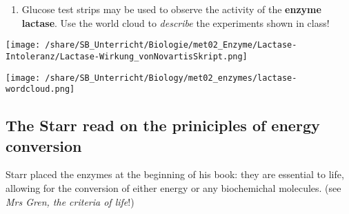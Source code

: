 \begin{enumerate}[itemsep=1.5em, leftmargin=*]
\item  Glucose test strips may be used to observe the activity of the \textbf{enzyme lactase}. Use the world cloud to \emph{describe} the experiments shown in class!
\end{enumerate}
\begin{marginfigure}[0pt]%
  \texttt{[image: /share/SB\_Unterricht/Biologie/met02\_Enzyme/Lactase-Intoleranz/Lactase-Wirkung\_vonNovartisSkript.png]}
\end{marginfigure}

\hspace{1.4cm}
\texttt{[image: /share/SB\_Unterricht/Biology/met02\_enzymes/lactase-wordcloud.png]}



 \areaset[0cm]{15cm}{28cm}
\subsection{The Starr read on the priniciples of energy conversion}
		\begin{mdframed}[style=exampledefault, userdefinedwidth=12cm,frametitle={Starr chapters 5.1, 5.2, 5.3, 5.4}\label{mat:BEISPIELMATERIAL}]	  
			Starr placed the enzymes at the beginning of his book: they are essential to life, allowing for the conversion of either energy or any biochemichal molecules. (see \textit{Mrs Gren, the criteria of life}!)
		\end{mdframed}
	
